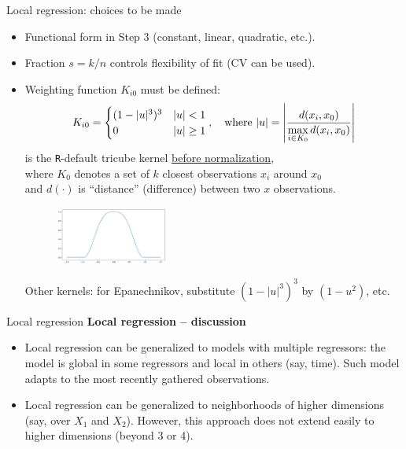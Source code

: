 \documentclass{beamer}
\begin{document}
\begin{frame}{Local regression: choices to be made}
\small
\begin{itemize}
    \item Functional form in Step 3 (constant, linear, quadratic, etc.).
    \item Fraction $s = k/n$ controls flexibility of fit (CV can be used).
    \item Weighting function $K_{i0}$ must be defined: 
    $$K_{i0}=
    \begin{cases}
    (1-|u|^3)^3 & |u| < 1 \\
    0 & |u| \geq 1
    \end{cases}, 
    \textnormal{~~~where~} 
    |u| = \left| 
    \frac{d(x_i,x_0)}{\underset{i \in K_0}{\max}\,d(x_i,x_0)}
    \right|
    $$
    is the \texttt{R}-default tricube kernel \textcolor{blue}{\underline{\href{https://en.wikipedia.org/wiki/Kernel_(statistics)}{before normalization}}}, \\where $K_0$ denotes a set of $k$ closest observations $x_i$ around $x_0$\\ and $d(\cdot)$ is ``distance'' (difference) between two $x$ observations.
    \smallskip
  \vspace{-0.1cm}
\begin{figure}
  \centering
  \includegraphics[trim=0cm 0.5cm 0cm 0cm, clip=true, width=0.35\textwidth]{IMG/tricubeKernel.png}
\end{figure}  
    Other kernels: for Epanechnikov, substitute $(1-|u|^3)^3$ by $(1-u^2)$, etc.
\end{itemize}
\bigskip

\end{frame}
\begin{frame}{Local regression}
\textbf{Local regression --  discussion}\\
\smallskip
\begin{itemize}
    \item Local regression can be generalized to models with multiple regressors: the model is global in some regressors and local in others (say, time). Such model adapts to the most recently gathered observations.
    \bigskip
    \item Local regression can be generalized to neighborhoods of higher dimensions (say, over $X_1$ and $X_2$). However, this approach does not extend easily to higher dimensions (beyond 3 or 4).
\end{itemize}
\end{frame}
\end{document}
